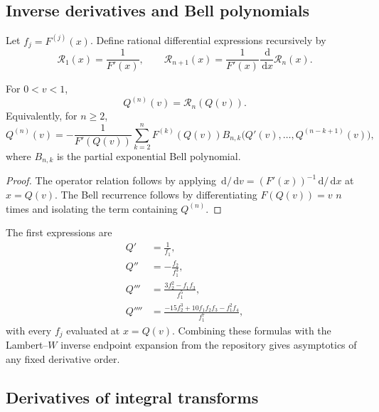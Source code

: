 \documentclass[11pt,oneside]{article}
\theoremstyle{definition}
\theoremstyle{remark}
\newcommand{\F}{F}
\newcommand{\Q}{Q}
\newcommand{\dd}{\,\mathrm d}
\newcommand{\1}{\mathbf 1}
\begin{document}
\subsection{Inverse derivatives and Bell polynomials}

Let \(f_j=\F^{(j)}(x)\).  Define rational differential expressions recursively by
\begin{equation}\label{p4:eq:Rinverse-rec}
 \mathcal R_1(x)=\frac1{\F'(x)},
 \qquad
 \mathcal R_{n+1}(x)=\frac1{\F'(x)}\frac{\dd}{\dd x}\mathcal R_n(x).
\end{equation}

\begin{proposition}\label{p4:prop:inverse-derivatives}
For \(0<v<1\),
\begin{equation}\label{p4:eq:Q-nth-operator}
 \Q^{(n)}(v)=\mathcal R_n(\Q(v)).
\end{equation}
Equivalently, for \(n\ge2\),
\begin{equation}\label{p4:eq:Q-Bell-rec}
 \Q^{(n)}(v)
 =-\frac1{\F'(\Q(v))}
 \sum_{k=2}^n\F^{(k)}(\Q(v))
 B_{n,k}\bigl(\Q'(v),\ldots,\Q^{(n-k+1)}(v)\bigr),
\end{equation}
where \(B_{n,k}\) is the partial exponential Bell polynomial.
\end{proposition}

\begin{proof}
The operator relation follows by applying \(\dd/\dd v=(\F'(x))^{-1}\dd/\dd x\) at
\(x=\Q(v)\).  The Bell recurrence follows by differentiating
\(\F(\Q(v))=v\) \(n\) times and isolating the term containing \(\Q^{(n)}\).
\end{proof}

The first expressions are
\begin{align}
 \Q'&=\frac1{f_1},\nonumber\\
 \Q''&=-\frac{f_2}{f_1^3},\nonumber\\
 \Q'''&=\frac{3f_2^2-f_1f_3}{f_1^5},\nonumber\\
 \Q''''&=\frac{-15f_2^3+10f_1f_2f_3-f_1^2f_4}{f_1^7},
 \label{p4:eq:Q-first-derivatives}
\end{align}
with every \(f_j\) evaluated at \(x=\Q(v)\).  Combining these formulas with the
Lambert--\(W\) inverse endpoint expansion from the repository gives asymptotics of any
fixed derivative order.

\subsection{Derivatives of integral transforms}
\end{document}
